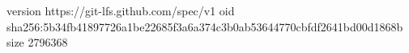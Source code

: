 version https://git-lfs.github.com/spec/v1
oid sha256:5b34fb41897726a1be22685f3a6a374c3b0ab53644770cbfdf2641bd00d1868b
size 2796368
